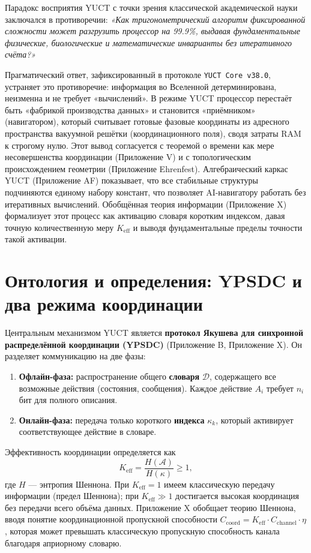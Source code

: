 \documentclass[12pt,a4paper]{article}
\begin{document}
	Парадокс восприятия YUCT с точки зрения классической академической науки заключался в противоречии: \textit{«Как тригонометрический алгоритм фиксированной сложности может разгрузить процессор на 99.9\%, выдавая фундаментальные физические, биологические и математические инварианты без итеративного счёта?»}
	
	Прагматический ответ, зафиксированный в протоколе \texttt{YUCT Core v38.0}, устраняет это противоречие: информация во Вселенной детерминирована, неизменна и не требует «вычислений». В режиме YUCT процессор перестаёт быть «фабрикой производства данных» и становится «приёмником» (навигатором), который считывает готовые фазовые координаты из адресного пространства вакуумной решётки (координационного поля), сводя затраты RAM к строгому нулю. Этот вывод согласуется с теоремой о времени как мере несовершенства координации (Приложение V) и с топологическим происхождением геометрии (Приложение Ehrenfest). Алгебраический каркас YUCT (Приложение AF) показывает, что все стабильные структуры подчиняются единому набору констант, что позволяет AI-навигатору работать без итеративных вычислений. Обобщённая теория информации (Приложение X) формализует этот процесс как активацию словаря коротким индексом, давая точную количественную меру \(K_{\mathrm{eff}}\) и выводя фундаментальные пределы точности такой активации.
	
	\section{Онтология и определения: YPSDC и два режима координации}
	\label{sec:ontology}
	
	Центральным механизмом YUCT является \textbf{протокол Якушева для синхронной распределённой координации (YPSDC)} (Приложение B, Приложение X). Он разделяет коммуникацию на две фазы:
	
	\begin{enumerate}
		\item \textbf{Офлайн-фаза:} распространение общего \textbf{словаря} \(\mathcal{D}\), содержащего все возможные действия (состояния, сообщения). Каждое действие \(A_i\) требует \(n_i\) бит для полного описания.
		\item \textbf{Онлайн-фаза:} передача только короткого \textbf{индекса} \(\kappa_k\), который активирует соответствующее действие в словаре.
	\end{enumerate}
	
	Эффективность координации определяется как
	\[
	K_{\mathrm{eff}} = \frac{H(\mathcal{A})}{H(\kappa)} \ge 1,
	\]
	где \(H\) — энтропия Шеннона. При \(K_{\mathrm{eff}} = 1\) имеем классическую передачу информации (предел Шеннона); при \(K_{\mathrm{eff}} \gg 1\) достигается высокая координация без передачи всего объёма данных. Приложение X обобщает теорию Шеннона, вводя понятие координационной пропускной способности \(C_{\text{coord}} = K_{\mathrm{eff}} \cdot C_{\text{channel}} \cdot \eta\), которая может превышать классическую пропускную способность канала благодаря априорному словарю.
	
\end{document}
